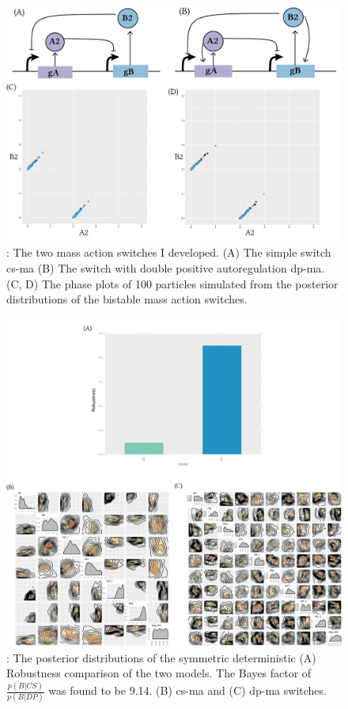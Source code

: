 \begin{figure}[htbp]
\begin{center}
\includegraphics[scale=0.7]{../../chapters/chapterStabilityFinder/images/MA-cs-dp-phase.png}
\caption[The mass action togge switches and phase plots]{ \label{fig:ma-cs-dp-phase}: The two mass action switches I developed. (A) The simple switch \acrshort{cs-ma} (B) The switch with double positive autoregulation \acrshort{dp-ma}. (C, D) The phase plots of 100 particles simulated from the posterior distributions of the bistable mass action switches.}
\end{center}
\end{figure}


\begin{figure}[htbp]
\centerfloat
\includegraphics[width=1.1\textwidth]{../../chapters/chapterStabilityFinder/images/MA_sym_post.png}
\caption[Robustness comparison of the \acrshort{cs-ma} and \acrshort{dp-ma} switches]{ \label{fig:ma-sym-det-post}: The posterior distributions of the symmetric deterministic (A) Robustness comparison of the two models. The Bayes factor of $\frac{p(B|CS)}{p(B|DP)}$ was found to be 9.14. (B) \acrshort{cs-ma} and  (C) \acrshort{dp-ma} switches. }
\end{figure}


